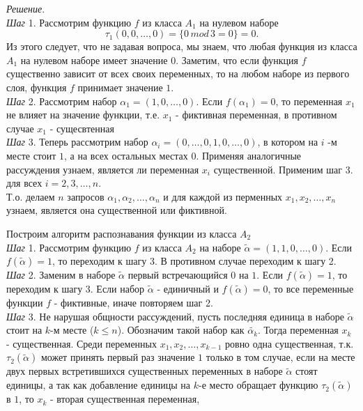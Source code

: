 \documentclass[oneside, final, 12pt]{extreport}
\begin{document}
	\noindent\emph{Решение}. \\
	\emph{Шаг} 1. Рассмотрим функцию $f$  из класса $A_1$ на нулевом наборе
	\[
		\tau_1(0, 0, \ldots, 0) =  \{0 \, mod \, 3 = 0\} = 0.
	\]
	Из этого следует, что не задавая вопроса, мы знаем, что любая функция из класса $A_1$ на нулевом наборе имеет значение $0$.
	Заметим, что если функция $f$ существенно зависит от всех своих переменных, то на любом наборе из первого слоя, функция $f$ принимает значение $1$.\\
	\emph{Шаг} 2. Рассмотрим набор $\alpha_1 = (1, 0,  \ldots, 0)$. Если $f(\alpha_1) = 0$, то переменная $x_1$ не влияет на значение функции, т.е. $x_1$ - 
	фиктивная переменная, в противном случае $x_1$ - сущесвтенная \\
	\emph{Шаг} 3. Теперь рассмотрим набор $\alpha_i = (0, \ldots, 0,  1,  0, \ldots, 0)$, в котором на $i$ -м месте стоит $1$, а на всех остальных местах $0$.
	 Применяя аналогичные рассуждения узнаем, является ли переменная $x_i$ существенной. Применим шаг 3. для всех $i = 2, 3, \ldots, n$. \\
	\noindent Т.о. делаем $n$  запросов $\alpha_1, \alpha_2, \ldots, \alpha_n$ и для каждой из перменных $x_1, x_2, \ldots, x_n$ узнаем, является она существенной 
	или фиктивной.\par
	\bigskip
	\noindent Построим алгоритм распознавания функции из класса $A_2$  \\
	\emph{Шаг} 1. Рассмотрим функцию $f$ из класса $A_2$  на наборе $\tilde{\alpha} = (1, 1, 0, \ldots, 0)$. Если $f(\tilde{\alpha}) = 1$, то переходим к шагу 3. В противном
	случае переходим к шагу 2. \\
	\emph{Шаг} 2. Заменим в  наборе $\tilde{\alpha}$ первый встречающийся $0$ на  $1$. Если $f(\tilde{\alpha}) = 1$, то переходим к шагу 3. Если набор
	 $\tilde{\alpha}$ - единичный и $f(\tilde{\alpha}) = 0$, то все переменные функции $f$ - фиктивные, иначе повторяем шаг 2.\\
	\emph{Шаг} 3. Не нарушая общности рассуждений, пусть последняя единица в наборе $\tilde{\alpha}$ стоит на $k$-м месте ($k \leq n$).
	 Обозначим такой набор как $\tilde{\alpha_k}$. Тогда переменная  $x_k$ - существенная.
	 Среди переменных $x_1, x_2, \ldots, x_{k-1}$ ровно одна существенная, т.к. $\tau_2(\tilde{\alpha})$ может принять первый раз значение $1$ только в 
	 том случае, если на месте двух первых встретившихся существенных переменных в наборе $\tilde{\alpha}$ стоят единицы, 
	 а так как добавление единицы на $k$-е место обращает функцию $\tau_2(\tilde{\alpha})$ в $1$, то $x_k$ -  вторая существенная переменная, 
\end{document}
